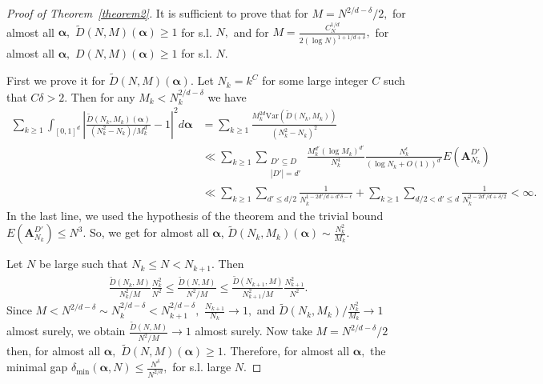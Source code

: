 \documentclass[12pt,article]{amsart}
\theoremstyle{remark}
\numberwithin{equation}{section}
\newcommand{\Var}{\text{Var}}
\newcommand{\boldA}{\boldsymbol{A}}
\newcommand{\boldalpha}{\boldsymbol{\alpha}}
\begin{document}
	\begin{proof}[Proof of Theorem~\ref{theorem2}]
		It is sufficient to prove that for $M=N^{2/d-\delta}/2,$ for almost all $\boldalpha,$ $\widetilde{D}(N,M)(\boldalpha)\geq 1$ for s.l. $N,$ and for $M=\frac{C_{N}^{1/d}}{2(\log N)^{1+1/d+\delta}},$ for almost all $\boldalpha,$ $D(N,M)(\boldalpha)\geq 1$ for s.l. $N.$
		
		First we prove it for $\widetilde{D}(N,M)(\boldalpha).$
		Let $N_k=k^C$ for some large integer $C$ such that $C\delta>2.$ Then for any $M_k<N_k^{2/d-\delta}$ we have 
		\begin{align*}
			\sum_{k\geq 1}\int_{[0,1]^d}\left|\frac{\widetilde{D}(N_k,M_k)(\boldalpha)}{(N_k^2-N_k)/M_k^{d}}-1\right|^2d\boldalpha&=\sum_{k\geq 1}\frac{M_k^{2d}\Var(\widetilde{D}(N_k,M_k))}{(N_k^2-N_k)^2}\\
			&\ll\sum_{k\geq 1}\sum_{\substack{D'\subseteq D\\|D'|=d'}}\frac{M_k^{d'}(\log M_k)^{d'}}{N_k^4}\frac{N_k^{\epsilon}}{(\log N_k+O(1))^{d'}}E(\boldA_{N_k}^{D'})\\
			&\ll\sum_{k\geq 1}\sum_{d'\leq d/2}\frac{1}{N_k^{1-2d'/d+d'\delta-\epsilon}}+\sum_{k\geq 1}\sum_{d/2<d'\leq d}\frac{1}{N_k^{2-2d'/d+\delta/2}}<\infty.
		\end{align*}
		In the last line, we used the hypothesis of the theorem and the trivial bound $E(\boldA_{N_k}^{D'})\leq N^3.$
		So, we get for almost all $\boldalpha$, $\widetilde{D}(N_k,M_k)(\boldalpha)\sim\frac{N_k^{2}}{M_k}.$ 
		
		Let $N$ be large such that $N_k\leq N<N_{k+1}.$ Then 
		\begin{align*}
			\frac{\widetilde{D}(N_{k},M)}{N_{k}^2/M}\frac{N_{k}^2}{N^2}\leq\frac{\widetilde{D}(N,M)}{N^2/M}\leq \frac{\widetilde{D}(N_{k+1},M)}{N_{k+1}^2/M}\frac{N_{k+1}^2}{N^2}.
		\end{align*}
		Since $M<N^{2/d-\delta}\sim N_k^{2/d-\delta}<N_{k+1}^{2/d-\delta},$ $\frac{N_{k+1}}{N_k}\to 1,$ and $\widetilde{D}(N_k,M_k)/\frac{N_k^2}{M_k}\to 1$ almost surely, we obtain $\frac{\widetilde{D}(N,M)}{N^2/M}\to 1$ almost surely.
		Now take $M=N^{2/d-\delta}/2$ then, for almost all $\boldalpha,$ $\widetilde{D}(N,M)(\boldalpha)\geq 1.$ Therefore, for almost all $\boldalpha,$ the minimal gap $\delta_{\text{min}}(\boldalpha,N)\leq\frac{N^\delta}{N^{2/d}},$ for s.l. large $N.$ 
		

\end{proof}
\end{document}
